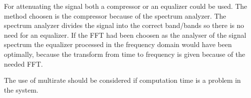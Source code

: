 For attenuating the signal both a compressor or an equalizer could be used. The method choosen is the compressor because of the spectrum analyzer. The spectrum analyzer divides the signal into the correct band/bands so there is no need for an equalizer. If the FFT had been choosen as the analyser of the signal spectrum the equalizer processed in the frequency domain would have been optimally, because the transform from time to frequency is given because of the needed FFT. 

The use of multirate should be considered if computation time is a problem in the system.






